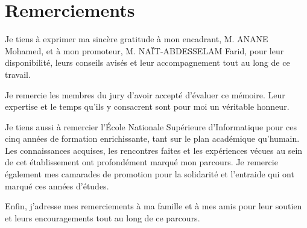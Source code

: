\chapter*{Remerciements}

Je tiens à exprimer ma sincère gratitude à mon encadrant, M. ANANE Mohamed, et à mon promoteur, M. NAÏT-ABDESSELAM Farid, pour leur disponibilité, leurs conseils avisés et leur accompagnement tout au long de ce travail.

Je remercie les membres du jury d'avoir accepté d'évaluer ce mémoire. Leur expertise et le temps qu'ils y consacrent sont pour moi un véritable honneur.

Je tiens aussi à remercier l'École Nationale Supérieure d'Informatique pour ces cinq années de formation enrichissante, tant sur le plan académique qu'humain. Les connaissances acquises, les rencontres faites et les expériences vécues au sein de cet établissement ont profondément marqué mon parcours. Je remercie également mes camarades de promotion pour la solidarité et l'entraide qui ont marqué ces années d'études.

Enfin, j'adresse mes remerciements à ma famille et à mes amis pour leur soutien et leurs encouragements tout au long de ce parcours.

